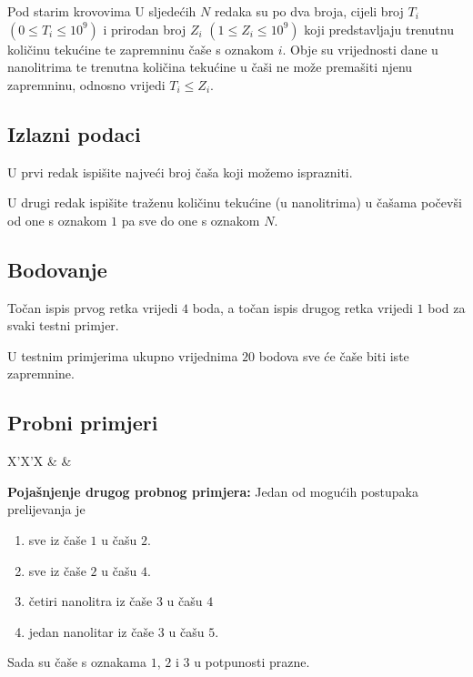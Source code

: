 \begin{statement}[
  problempoints=50,
  timelimit=1 sekunda,
  memorylimit=512 MiB,
]{Pod starim krovovima}
U sljedećih $N$ redaka su po dva broja, cijeli broj $T_i$ $(0 \le T_i \le 10^9)$
i prirodan broj $Z_i$ $(1 \le Z_i \le 10^9)$ koji predstavljaju trenutnu
količinu tekućine te zapremninu čaše s oznakom $i$. Obje su vrijednosti dane
u nanolitrima te trenutna količina tekućine u čaši ne može premašiti njenu
zapremninu, odnosno vrijedi $T_i \le Z_i$.

\subsection*{Izlazni podaci}
U prvi redak ispišite najveći broj čaša koji možemo isprazniti.

U drugi redak ispišite traženu količinu tekućine (u nanolitrima) u čašama
počevši od one s oznakom $1$ pa sve do one s oznakom $N$.

\subsection*{Bodovanje}
Točan ispis prvog retka vrijedi $4$ boda, a točan ispis drugog retka vrijedi $1$
bod za svaki testni primjer.

U testnim primjerima ukupno vrijednima $20$ bodova sve će čaše biti iste
zapremnine.

\subsection*{Probni primjeri}
\begin{tabularx}{\textwidth}{X'X'X}
 &
 &
\end{tabularx}

\textbf{Pojašnjenje drugog probnog primjera:}
Jedan od mogućih postupaka prelijevanja je
\begin{enumerate}
  \item sve iz čaše $1$ u čašu $2$.
  \item sve iz čaše $2$ u čašu $4$.
  \item četiri nanolitra iz čaše $3$ u čašu $4$
  \item jedan nanolitar iz čaše $3$ u čašu $5$.
\end{enumerate}
Sada su čaše s oznakama $1$, $2$ i $3$ u potpunosti prazne.

\end{statement}

